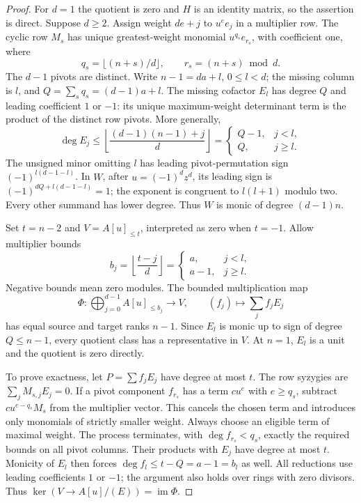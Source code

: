 \documentclass[11pt]{article}
\begin{document}
\begin{proof}
For $d=1$ the quotient is zero and $H$ is an identity matrix, so the
assertion is direct. Suppose $d\ge2$.
Assign weight $de+j$ to $u^ee_j$ in a multiplier row.
The cyclic row $M_s$ has unique greatest-weight monomial
$u^{q_s}e_{r_s}$, with coefficient one, where
\[
 q_s=\lfloor(n+s)/d\rfloor,\qquad r_s=(n+s)\bmod d.
\]
The $d-1$ pivots are distinct. Write $n-1=da+l$, $0\le l<d$;
the missing column is $l$, and $Q=\sum_sq_s=(d-1)a+l$.
The missing cofactor $E_l$ has degree $Q$ and leading coefficient
$1$ or $-1$: its unique maximum-weight determinant term is the
product of the distinct row pivots. More generally,
\[
 \deg E_j\le\left\lfloor\frac{(d-1)(n-1)+j}{d}\right\rfloor
 =\begin{cases}Q-1,&j<l,\\Q,&j\ge l.\end{cases}
\]
The unsigned minor omitting $l$ has leading pivot-permutation sign
$(-1)^{l(d-1-l)}$. In $W$, after $u=(-1)^dz^d$, its leading sign
is $(-1)^{dQ+l(d-1-l)}=1$; the exponent is congruent to $l(l+1)$
modulo two. Every other summand has lower degree. Thus $W$ is monic
of degree $(d-1)n$.

Set $t=n-2$ and $V=A[u]_{\le t}$, interpreted as zero when $t=-1$.
Allow multiplier bounds
\[
 b_j=\left\lfloor\frac{t-j}{d}\right\rfloor
 =\begin{cases}a,&j<l,\\a-1,&j\ge l.\end{cases}
\]
Negative bounds mean zero modules. The bounded multiplication map
\[
 \Phi:\bigoplus_{j=0}^{d-1}A[u]_{\le b_j}\longrightarrow V,
 \qquad(f_j)\longmapsto\sum_jf_jE_j
\]
has equal source and target ranks $n-1$.
Since $E_l$ is monic up to sign of degree $Q\le n-1$, every quotient
class has a representative in $V$. At $n=1$, $E_l$ is a unit and
the quotient is zero directly.

To prove exactness, let $P=\sum f_jE_j$ have degree at most $t$.
The row syzygies are $\sum_jM_{s,j}E_j=0$.
If a pivot component $f_{r_s}$ has a term $cu^e$ with $e\ge q_s$,
subtract $cu^{e-q_s}M_s$ from the multiplier vector.
This cancels the chosen term and introduces only monomials of
strictly smaller weight. Always choose an eligible term of maximal
weight. The process terminates, with
$\deg f_{r_s}<q_s$, exactly the required bounds on all pivot columns.
Their products with $E_j$ have degree at most $t$.
Monicity of $E_l$ then forces
$\deg f_l\le t-Q=a-1=b_l$ as well.
All reductions use leading coefficients $1$ or $-1$; the argument
also holds over rings with zero divisors.
Thus $\ker(V\to A[u]/(E))=\operatorname{im}\Phi$.


\end{proof}
\end{document}
